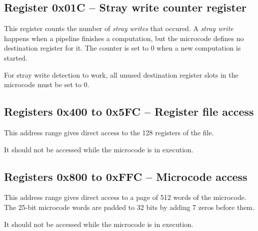 \documentclass[a4paper,11pt]{article}
\begin{document}
\subsection{Register 0x01C -- Stray write counter register}
This register counts the number of \textit{stray writes} that occured. A \textit{stray write} happens when a pipeline finishes a computation, but the microcode defines no destination register for it. The counter is set to 0 when a new computation is started.

For stray write detection to work, all unused destination register slots in the microcode must be set to 0.

\subsection{Registers 0x400 to 0x5FC -- Register file access}
This address range gives direct access to the 128 registers of the file.

It should not be accessed while the microcode is in execution.

\subsection{Registers 0x800 to 0xFFC -- Microcode access}
This address range gives direct access to a page of 512 words of the microcode. The 25-bit microcode words are padded to 32 bits by adding 7 zeros before them.

It should not be accessed while the microcode is in execution.
\end{document}
